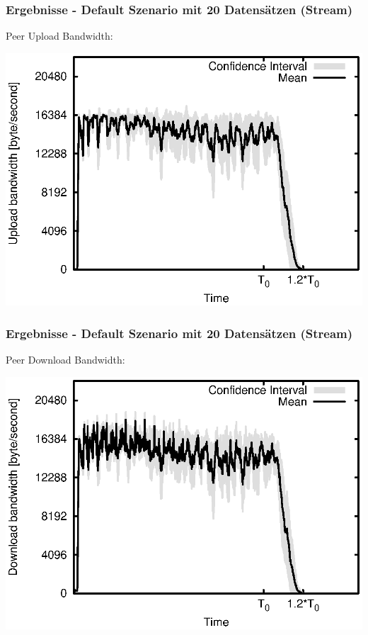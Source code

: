 \begin{frame}
  \frametitle{Ergebnisse - Default Szenario mit 20 Datensätzen (Stream)}
  Peer Upload Bandwidth:
  
  \begin{center}
    \includegraphics[width=1\textwidth]{fig/plots/scenario_6_parts_20/plots/GeneratedMeanCurrentUploadBandwidth.csv.eps}
  \end{center}
\end{frame}


\begin{frame}
  \frametitle{Ergebnisse - Default Szenario mit 20 Datensätzen (Stream)}
  Peer Download Bandwidth:
  
  \begin{center}
    \includegraphics[width=1\textwidth]{fig/plots/scenario_6_parts_20/plots/GeneratedMeanCurrentDownloadBandwidth.csv.eps}
  \end{center}
\end{frame}





